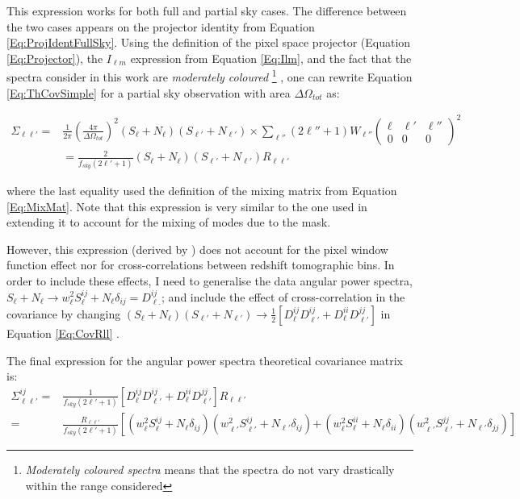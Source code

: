 \qquad This expression works for both full and partial sky cases. The difference between the two cases appears on the projector identity from Equation \eqref{Eq:ProjIdentFullSky}. Using the definition of the pixel space projector (Equation \ref{Eq:Projector}), the $I_{\ell m}$ expression from Equation \eqref{Eq:Ilm}, and the fact that the spectra consider in this work are \textit{moderately coloured} \footnote{\textit{Moderately coloured spectra} means that the spectra do not vary drastically within the range considered} \citep{2008DahlenSimons}, one can rewrite Equation \eqref{Eq:ThCovSimple} for a partial sky observation with area $\Delta\Omega_{tot}$ as:

\begin{align}
\Sigma_{\ell \ell'}   = & \frac{1}{2\pi}\left(\frac{4\pi}{\Delta\Omega_{tot}}\right)^2 (S_{\ell} + N_{\ell})(S_{\ell '}+ N_{\ell '}) \times \sum_{\ell ''}(2\ell ''+1)W_{\ell''}\begin{pmatrix} \ell & \ell' & \ell'' \\ 0 & 0 & 0 \end{pmatrix}^2 \\ 
& = \frac{2}{f_{sky}(2\ell' + 1)}(S_{\ell} + N_{\ell})(S_{\ell '}+ N_{\ell '})R_{\ell\ell'}
\label{Eq:CovRll}
\end{align}

where the last equality used the definition of the mixing matrix from Equation \eqref{Eq:MixMat}. Note that this expression is very similar to the one used in \cite{Blake2007,Padm2007,Thomas2011} extending it to account for the mixing of modes due to the mask. 

\qquad However, this expression (derived by \citealt{2008DahlenSimons}) does not account for the pixel window function effect nor for cross-correlations between redshift tomographic bins. In order to include these effects, I need to generalise the data angular power spectra, $S_{\ell} + N_{\ell} \rightarrow w_{\ell}^2S_{\ell}^{ij} + N_{\ell}\delta_{ij} = D^{ij}_{\ell.}$; and include the effect of cross-correlation in the covariance by changing $(S_{\ell} + N_{\ell})(S_{\ell'} + N_{\ell'})\rightarrow \frac{1}{2}[D^{ij}_{\ell}D^{ij}_{\ell'} + D^{ii}_{\ell}D^{jj}_{\ell'}]$ in Equation \eqref{Eq:CovRll} \citep{Rassat2007}. 

\qquad The final expression for the angular power spectra theoretical covariance matrix is:
\begin{align}
\Sigma_{\ell \ell'}^{ij}  = & \frac{1}{f_{sky}(2\ell'+1)}[D^{ij}_{\ell}D^{ij}_{\ell'} + D^{ii}_{\ell}D^{jj}_{\ell'}] R_{\ell \ell'} \\
= & \frac{R_{\ell\ell'}}{f_{sky}(2\ell'+1)} \left[(w_{\ell}^2S_{\ell}^{ij} + N_{\ell}\delta_{ij})(w_{\ell'}^2S_{\ell'}^{ij} + N_{\ell'}\delta_{ij}) \right. \left. + \, (w_{\ell}^2S_{\ell}^{ii} + N_{\ell}\delta_{ii})(w_{\ell'}^2S_{\ell'}^{jj} + N_{\ell'}\delta_{jj}) \right]
\label{Eq:TheoVariance}
\end{align}


